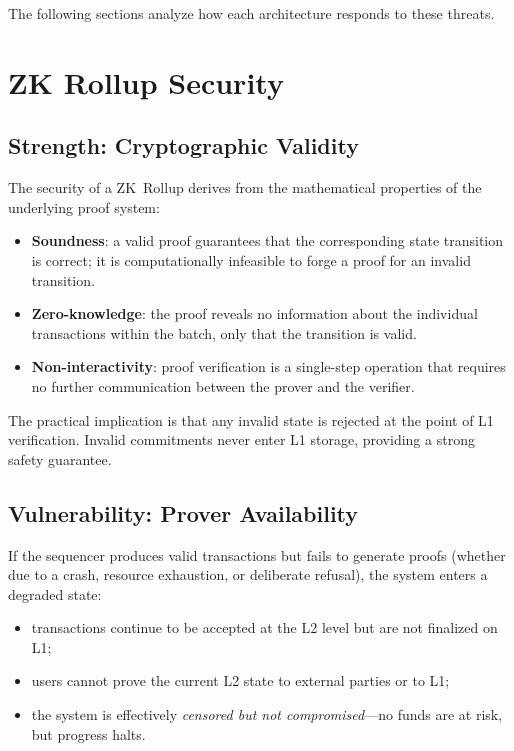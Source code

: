 \documentclass[
]{elteikthesis}[2024/04/26]
\begin{document}
The following sections analyze how each architecture responds to these threats.

\section{ZK Rollup Security}

\subsection{Strength: Cryptographic Validity}

The security of a ZK~Rollup derives from the mathematical properties of the underlying proof system:
\begin{itemize}
    \item \textbf{Soundness}: a valid proof guarantees that the corresponding state transition is correct; it is computationally infeasible to forge a proof for an invalid transition.
    \item \textbf{Zero-knowledge}: the proof reveals no information about the individual transactions within the batch, only that the transition is valid.
    \item \textbf{Non-interactivity}: proof verification is a single-step operation that requires no further communication between the prover and the verifier.
\end{itemize}

The practical implication is that any invalid state is rejected at the point of L1 verification. Invalid commitments never enter L1 storage, providing a strong safety guarantee.

\subsection{Vulnerability: Prover Availability}

If the sequencer produces valid transactions but fails to generate proofs (whether due to a crash, resource exhaustion, or deliberate refusal), the system enters a degraded state:
\begin{itemize}
    \item transactions continue to be accepted at the L2 level but are not finalized on L1;
    \item users cannot prove the current L2 state to external parties or to L1;
    \item the system is effectively \textit{censored but not compromised}---no funds are at risk, but progress halts.
\end{itemize}
\end{document}
